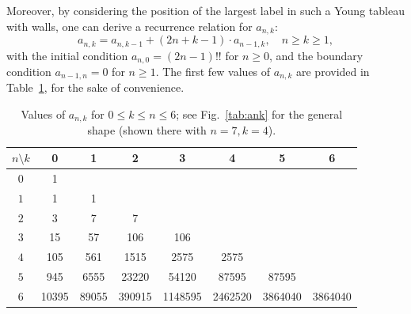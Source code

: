 \documentclass[reqno, 12pt]{article}
\theoremstyle{mydefinition}
\theoremstyle{myremark}
\numberwithin{algorithm}{section}
\begin{document}
Moreover, by considering the position of the largest label in such a Young tableau with walls, one
can derive a recurrence relation for $a_{n,k}$:
\begin{equation}\label{rec:ank}
a_{n,k}=a_{n,k-1}+(2n+k-1)\cdot a_{n-1,k},\quad n\geq k\geq 1,
\end{equation}
with the initial condition $a_{n,0}=(2n-1)!!$ for $n\ge 0$, and the boundary condition $a_{n-1,n}=0$ for $n\ge 1$.
The first few values of $a_{n,k}$ are provided in Table~\ref{tabb-Ank}, for the sake of convenience.
\begin{tiny}
\begin{table}
\centering
\caption{Values of $a_{n,k}$ for $0\le k\le n\le 6$; see Fig.~\ref{tab:ank} for the general shape (shown there with $n=7,k=4$).}

\label{tabb-Ank}
    	\begin{tabular}{c||c|c|c|c|c|c|c}
    		\hline \hline
$n\setminus k$ & 0 & 1 & 2 & 3 & 4 & 5 & 6 \\
    		\hline
$0$ & 1 &   &   &   &   &  &  \\
    		\hline
$1$ & 1 &  1 &   &   &   &  &  \\
    		\hline
$2$ & 3 &  7 &  7 &   &   &  &  \\
    		\hline
$3$ & 15 & 57  & 106  & 106  &   &  &  \\
    		\hline
$4$ & 105 & 561  & 1515  & 2575  & 2575  &  &  \\
    		\hline
$5$ & 945 &  6555 & 23220  &  54120 & 87595  &  87595 &  \\
    		\hline
$6$ & 10395 & 89055  &  390915  &  1148595  &  2462520  & 3864040 & 3864040 \\
    		\hline
    	\end{tabular}
\end{table}
\end{tiny}
\end{document}
